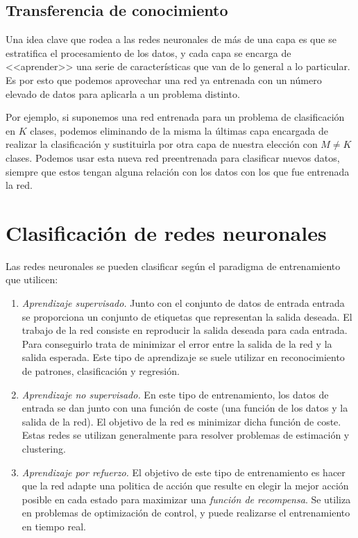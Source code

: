 \documentclass[
  a4paper,
  12pt,
  spanish,
]{scrartcl}
\theoremstyle{teorema-style}
\begin{document}
\subsection{Transferencia de conocimiento}

Una idea clave que rodea a las redes neuronales de más de una capa es que se estratifica el procesamiento de los datos, y cada capa se encarga de <<aprender>> una serie de características que van de lo general a lo particular. Es por esto que podemos aprovechar una red ya entrenada con un número elevado de datos para aplicarla a un problema distinto.

Por ejemplo, si suponemos una red entrenada para un problema de clasificación en $K$ clases, podemos eliminando de la misma la últimas capa encargada de realizar la clasificación y sustituirla por otra capa de nuestra elección con $M \neq K$ clases. Podemos usar esta nueva red preentrenada para clasificar nuevos datos, siempre que estos tengan alguna relación con los datos con los que fue entrenada la red.

\section{Clasificación de redes neuronales}
\label{sec:clasificacion}

Las redes neuronales se pueden clasificar según el paradigma de entrenamiento que utilicen:

\begin{enumerate}
\item \textit{Aprendizaje supervisado. } Junto con el conjunto de datos de entrada entrada se proporciona un conjunto de etiquetas que representan la salida deseada. El trabajo de la red consiste en reproducir la salida deseada para cada entrada. Para conseguirlo trata de minimizar el error entre la salida de la red y la salida esperada. Este tipo de aprendizaje se suele utilizar en reconocimiento de patrones, clasificación y regresión.
\item \textit{Aprendizaje no supervisado. } En este tipo de entrenamiento, los
  datos de entrada se dan junto con una función de coste (una función de los
  datos y la salida de la red). El objetivo de la red es minimizar dicha función
  de coste. Estas redes se utilizan generalmente para resolver problemas de
  estimación y clustering.
\item \textit{Aprendizaje por refuerzo. } El objetivo de este tipo de
  entrenamiento es hacer que la red adapte una politica de acción que resulte en elegir la mejor acción posible en cada estado para maximizar una \textit{función de recompensa}. Se utiliza en problemas de optimización de control, y puede realizarse el entrenamiento en tiempo real.
\end{enumerate}
\end{document}
